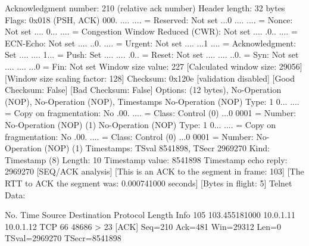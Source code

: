     Acknowledgment number: 210    (relative ack number)
    Header length: 32 bytes
    Flags: 0x018 (PSH, ACK)
        000. .... .... = Reserved: Not set
        ...0 .... .... = Nonce: Not set
        .... 0... .... = Congestion Window Reduced (CWR): Not set
        .... .0.. .... = ECN-Echo: Not set
        .... ..0. .... = Urgent: Not set
        .... ...1 .... = Acknowledgment: Set
        .... .... 1... = Push: Set
        .... .... .0.. = Reset: Not set
        .... .... ..0. = Syn: Not set
        .... .... ...0 = Fin: Not set
    Window size value: 227
    [Calculated window size: 29056]
    [Window size scaling factor: 128]
    Checksum: 0x120e [validation disabled]
        [Good Checksum: False]
        [Bad Checksum: False]
    Options: (12 bytes), No-Operation (NOP), No-Operation (NOP), Timestamps
        No-Operation (NOP)
            Type: 1
                0... .... = Copy on fragmentation: No
                .00. .... = Class: Control (0)
                ...0 0001 = Number: No-Operation (NOP) (1)
        No-Operation (NOP)
            Type: 1
                0... .... = Copy on fragmentation: No
                .00. .... = Class: Control (0)
                ...0 0001 = Number: No-Operation (NOP) (1)
        Timestamps: TSval 8541898, TSecr 2969270
            Kind: Timestamp (8)
            Length: 10
            Timestamp value: 8541898
            Timestamp echo reply: 2969270
    [SEQ/ACK analysis]
        [This is an ACK to the segment in frame: 103]
        [The RTT to ACK the segment was: 0.000741000 seconds]
        [Bytes in flight: 5]
Telnet
    Data: 

No.     Time           Source                Destination           Protocol Length Info
    105 103.455181000  10.0.1.11             10.0.1.12             TCP      66     48686 > 23 [ACK] Seq=210 Ack=481 Win=29312 Len=0 TSval=2969270 TSecr=8541898


